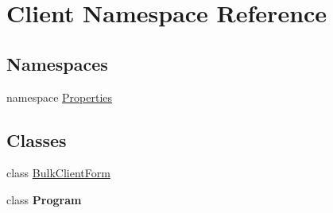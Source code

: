 \hypertarget{namespace_client}{}\section{Client Namespace Reference}
\label{namespace_client}
\subsection*{Namespaces}
\begin{DoxyCompactItemize}
\item 
namespace \mbox{\hyperlink{namespace_client_1_1_properties}{Properties}}
\end{DoxyCompactItemize}
\subsection*{Classes}
\begin{DoxyCompactItemize}
\item 
class \mbox{\hyperlink{class_client_1_1_bulk_client_form}{Bulk\+Client\+Form}}
\item 
class {\bfseries Program}
\end{DoxyCompactItemize}
